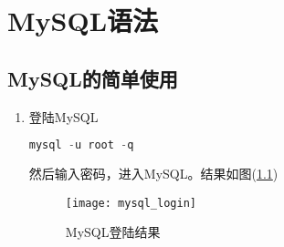 \chapter{MySQL语法}
\section{MySQL的简单使用}
\begin{enumerate}
	\item 登陆MySQL
	\begin{lstlisting}[language=SQL]
		mysql -u root -q
	\end{lstlisting}
	然后输入密码，进入MySQL。结果如图(\ref{mysql_login})
	\begin{figure}[H]
		\centering
		\label{mysql_login}
		\caption{MySQL登陆结果}
		\texttt{[image: mysql\_login]}
	\end{figure}
\end{enumerate}
